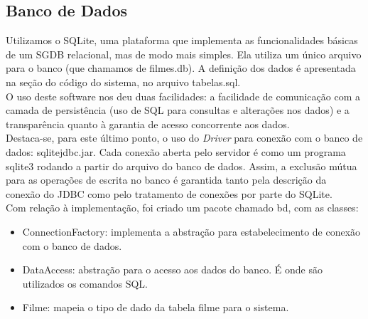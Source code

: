\documentclass[11pt,twoside]{article}
\begin{document}
\subsection{Banco de Dados}
Utilizamos o SQLite, uma plataforma que implementa as funcionalidades básicas de um SGDB relacional, mas de modo mais simples. Ela utiliza um único arquivo para o banco (que chamamos de filmes.db). A definição dos dados é apresentada na seção do código do sistema, no arquivo tabelas.sql.\\
O uso deste software nos deu duas facilidades: a facilidade de comunicação com a camada de persistência (uso de SQL para consultas e alterações nos dados) e a transparência quanto à garantia de acesso concorrente aos dados.\\
Destaca-se, para este último ponto, o uso do \textit{Driver} para conexão com o banco de dados: sqlitejdbc.jar. Cada conexão aberta pelo servidor é como um programa sqlite3 rodando a partir do arquivo do banco de dados. Assim, a exclusão mútua para as operações de escrita no banco é garantida tanto pela descrição da conexão do JDBC como pelo tratamento de conexões por parte do SQLite.\\
Com relação à implementação, foi criado um pacote chamado bd, com as classes:
\begin{itemize}
  \item ConnectionFactory: implementa a abstração para estabelecimento de conexão com o banco de dados.
  \item DataAccess: abstração para o acesso aos dados do banco. É onde são utilizados os comandos SQL.
  \item Filme: mapeia o tipo de dado da tabela filme para o sistema.
\end{itemize}
\end{document}
